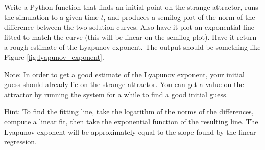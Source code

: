 \begin{problem}
Write a Python function that finds an initial point on the strange attractor, runs the simulation to a given time $t$, and produces a semilog plot of the norm of the difference between the two solution curves.
Also have it plot an exponential line fitted to match the curve (this will be linear on the semilog plot).
Have it return a rough estimate of the Lyapunov exponent.
The output should be something like Figure \ref{fig:lyapunov_exponent}.

Note: In order to get a good estimate of the Lyapunov exponent, your initial guess should already lie on the strange attractor.
You can get a value on the attractor by running the system for a while to find a good initial guess.

Hint: To find the fitting line, take the logarithm of the norms of the differences, compute a linear fit, then take the exponential function of the resulting line.
The Lyapunov exponent will be approximately equal to the slope found by the linear regression.
\end{problem}